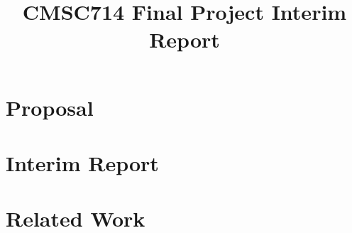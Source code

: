 \documentclass{article}
\begin{document}
\sloppy

\title{CMSC714 Final Project Interim Report}
%

\makeatletter
\def\@name{ \emph{Kyunghun Lee, Honglei Li, Jiahao Wu}}
\makeatother

\address{Department of Electrical and Computer Engineering}

\maketitle





\vspace{-1.2em}

\section{Proposal}
\label{sec:proposal}


\section{Interim Report}
\label{sec:interim}


\section{Related Work}
\label{sec:related}





\end{document}
